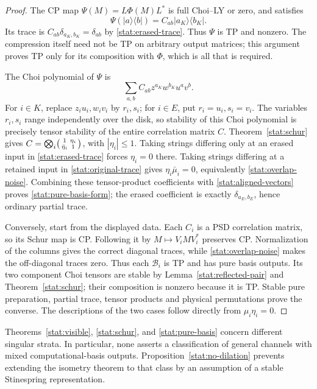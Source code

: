 \documentclass[reqno]{amsart}
\theoremstyle{definition}
\theoremstyle{remark}
\begin{document}
\begin{proof}
The CP map \(\Psi(M)=L\Phi(M)L^*\) is full Choi--LY or zero,
and satisfies
\[
 \Psi(|a\rangle\langle b|)=C_{ab}|a_K\rangle\langle b_K|.
\]
Its trace is \(C_{ab}\delta_{a_K,b_K}=\delta_{ab}\) by
\eqref{stat:erased-trace}.  Thus \(\Psi\) is TP and nonzero.
The compression itself need not be TP on arbitrary output
matrices; this argument proves TP only for its composition with
\(\Phi\), which is all that is required.

The Choi polynomial of \(\Psi\) is
\[
 \sum_{a,b}C_{ab}z^{a_K}w^{b_K}u^av^b.
\]
For \(i\in K\), replace \(z_iu_i,w_iv_i\) by \(r_i,s_i\);
for \(i\in E\), put \(r_i=u_i,s_i=v_i\).
The variables \(r_i,s_i\) range independently over the disk,
so stability of this Choi polynomial is precisely tensor
stability of the entire correlation matrix \(C\).
Theorem~\ref{stat:schur} gives
\(C=\bigotimes_i\begin{psmallmatrix}1&\eta_i\\\bar\eta_i&1\end{psmallmatrix}\),
with \(|\eta_i|\le1\).  Taking strings differing only at an
erased input in \eqref{stat:erased-trace} forces \(\eta_i=0\)
there.  Taking strings differing at a retained input in
\eqref{stat:original-trace} gives
\(\eta_i\bar\mu_i=0\), equivalently
\eqref{stat:overlap-noise}.  Combining these tensor-product
coefficients with \eqref{stat:aligned-vectors} proves
\eqref{stat:pure-basis-form}; the erased coefficient is exactly
\(\delta_{a_E,b_E}\), hence ordinary partial trace.

Conversely, start from the displayed data.  Each \(C_i\) is a
PSD correlation matrix, so its Schur map is CP.  Following it
by \(M\mapsto V_iMV_i^*\) preserves CP.  Normalization of
the columns gives the correct diagonal traces, while
\eqref{stat:overlap-noise} makes the off-diagonal traces zero.
Thus each \(\mathcal B_i\) is TP and has pure basis outputs.
Its two component Choi tensors are stable by
Lemma~\ref{stat:reflected-pair} and
Theorem~\ref{stat:schur}; their composition is nonzero because
it is TP.  Stable pure preparation, partial trace, tensor
products and physical permutations prove the converse.
The descriptions of the two cases follow directly from
\(\mu_i\eta_i=0\).
\end{proof}

Theorems~\ref{stat:visible}, \ref{stat:schur}, and
\ref{stat:pure-basis} concern different singular strata.
In particular, none asserts a classification of general channels
with mixed computational-basis outputs.  Proposition~\ref{stat:no-dilation}
prevents extending the isometry theorem to that class by an
assumption of a stable Stinespring representation.
\end{document}
